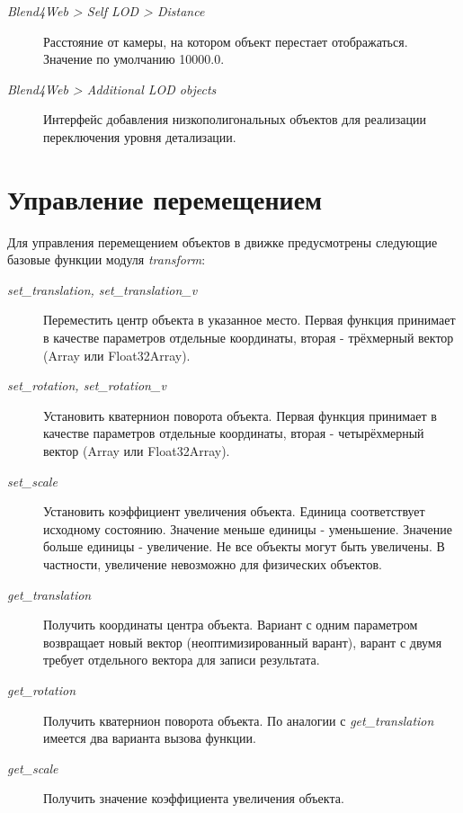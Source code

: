 \documentclass[a4paper,12pt,oneside]{sphinxmanual}
\begin{document}
\begin{description}
\item[{\emph{Blend4Web \textgreater{} Self LOD \textgreater{} Distance}}] \leavevmode
Расстояние от камеры, на котором объект перестает отображаться. Значение по умолчанию 10000.0.

\item[{\emph{Blend4Web \textgreater{} Additional LOD objects}}] \leavevmode
Интерфейс добавления низкополигональных объектов для реализации переключения уровня детализации.

\end{description}


\section{Управление перемещением}
\label{objects:id4}
Для управления перемещением объектов в движке предусмотрены следующие базовые функции модуля \emph{transform}:
\begin{description}
\item[{\emph{set\_translation, set\_translation\_v}}] \leavevmode
Переместить центр объекта в указанное место. Первая функция принимает в качестве параметров отдельные координаты, вторая - трёхмерный вектор (Array или Float32Array).

\item[{\emph{set\_rotation, set\_rotation\_v}}] \leavevmode
Установить кватернион поворота объекта. Первая функция принимает в качестве параметров отдельные координаты, вторая - четырёхмерный вектор (Array или Float32Array).

\item[{\emph{set\_scale}}] \leavevmode
Установить коэффициент увеличения объекта. Единица соответствует исходному состоянию. Значение меньше единицы - уменьшение. Значение больше единицы - увеличение. Не все объекты могут быть увеличены. В частности, увеличение невозможно для физических объектов.

\item[{\emph{get\_translation}}] \leavevmode
Получить координаты центра объекта. Вариант с одним параметром возвращает новый вектор (неоптимизированный варант), варант с двумя требует отдельного вектора для записи результата.

\item[{\emph{get\_rotation}}] \leavevmode
Получить кватернион поворота объекта. По аналогии с \emph{get\_translation} имеется два варианта вызова функции.

\item[{\emph{get\_scale}}] \leavevmode
Получить значение коэффициента увеличения объекта.

\end{description}
\end{document}
